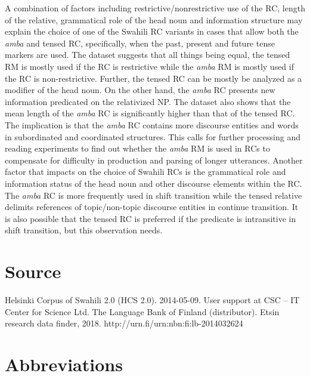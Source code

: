\documentclass[output=paper,colorlinks,citecolor=brown]{langscibook}
\begin{document}
A combination of factors including restrictive/nonrestrictive use of the RC, length of the relative, grammatical role of the head noun and information structure may explain the choice of one of the Swahili RC variants in cases that allow both the \textit{amba} and tensed RC, specifically, when the past, present and future tense markers are used. The dataset suggests that all things being equal, the tensed RM is mostly used if the RC is restrictive while the \textit{amba} RM is mostly used if the RC is non-restrictive. Further, the tensed RC can be mostly be analyzed as a modifier of the head noun. On the other hand, the \textit{amba} RC presents new information predicated on the relativized NP. The dataset also shows that the mean length of the \textit{amba} RC is significantly higher than that of the tensed RC. The implication is that the \textit{amba} RC contains more discourse entities and words in subordinated and coordinated structures. This calls for further processing and reading experiments to find out whether the \textit{amba} RM is used in RCs to compensate for difficulty in production and parsing of longer utterances. Another factor that impacts on the choice of Swahili RCs is the grammatical role and information status of the head noun and other discourse elements within the RC. The \textit{amba} RC is more frequently used in shift transition while the tensed relative delimits references of topic/non-topic discourse entities in continue transition. It is also possible that the tensed RC is preferred if the predicate is intransitive in shift transition, but this observation needs.

\section*{Source}

Helsinki Corpus of Swahili 2.0 (HCS 2.0). 2014-05-09. User support at CSC -- IT Center for Science Ltd. The Language Bank of Finland (distributor). Etsin research data finder, 2018. http://urn.fi/urn:nbn:fi:lb-2014032624

\section*{Abbreviations}
\end{document}
